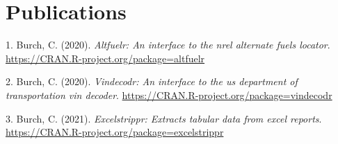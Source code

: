 \documentclass[11pt, a4paper]{awesome-cv}
\begin{document}
\hypertarget{publications}{%
\section{Publications}\label{publications}}

\hypertarget{bibliography}{}
\leavevmode\hypertarget{ref-R-altfuelr}{}%
1. Burch, C. (2020). \emph{Altfuelr: An interface to the nrel alternate
fuels locator}. \url{https://CRAN.R-project.org/package=altfuelr}

\leavevmode\hypertarget{ref-R-vindecodr}{}%
2. Burch, C. (2020). \emph{Vindecodr: An interface to the us department
of transportation vin decoder}.
\url{https://CRAN.R-project.org/package=vindecodr}

\leavevmode\hypertarget{ref-R-excelstrippr}{}%
3. Burch, C. (2021). \emph{Excelstrippr: Extracts tabular data from
excel reports}. \url{https://CRAN.R-project.org/package=excelstrippr}
\end{document}
